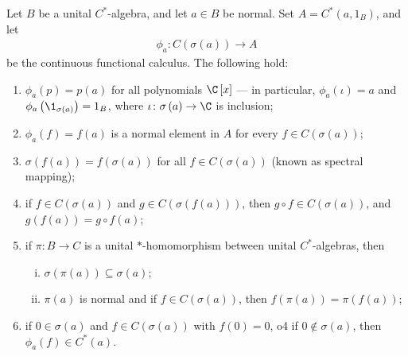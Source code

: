 \documentclass[10pt]{mypackage}
\begin{document}
\begin{theorem}
  Let $B$ be a unital $C^{\ast}$-algebra, and let $a\in B$ be normal. Set $A = C^{\ast}\left(a,1_B\right)$, and let
  \begin{align*}
    \phi_a\colon C\left(\sigma\left(a\right)\right)\rightarrow A
  \end{align*}
  be the continuous functional calculus. The following hold:
  \begin{enumerate}[(1)]
    \item $\phi_a\left(p\right) = p(a)$ for all polynomials $\C\left[x\right]$ --- in particular, $\phi_a\left(\iota\right) = a$ and $\phi_a\left(\1_{\sigma\left(a\right)}\right) = 1_B$, where $\iota\colon \sigma\left(a\right)\rightarrow \C$ is inclusion;
    \item $\phi_a\left(f\right) = f(a)$ is a normal element in $A$ for every $f\in C\left(\sigma\left(a\right)\right)$;
    \item $\sigma\left(f\left(a\right)\right) = f\left(\sigma\left(a\right)\right)$ for all $f\in C\left(\sigma\left(a\right)\right)$ (known as spectral mapping);
    \item if $f\in C\left(\sigma\left(a\right)\right)$ and $g\in C\left(\sigma\left(f\left(a\right)\right)\right)$, then $g\circ f\in C\left(\sigma\left(a\right)\right)$, and $g\left(f\left(a\right)\right) = g\circ f\left(a\right)$;
    \item if $\pi\colon B\rightarrow C$ is a unital $\ast$-homomorphism between unital $C^{\ast}$-algebras, then
      \begin{enumerate}[(i)]
        \item $\sigma\left(\pi\left(a\right)\right)\subseteq \sigma\left(a\right)$;
        \item $\pi\left(a\right)$ is normal and if $f\in C\left(\sigma\left(a\right)\right)$, then $f\left(\pi\left(a\right)\right) = \pi\left(f\left(a\right)\right)$;
      \end{enumerate}
    \item if $0\in \sigma\left(a\right)$ and $f\in C\left(\sigma\left(a\right)\right)$ with $f\left(0\right) = 0$, o4 if $0\notin \sigma\left(a\right)$, then $\phi_a\left(f\right) \in C^{\ast}\left(a\right)$.
  \end{enumerate}
\end{theorem}
\end{document}

